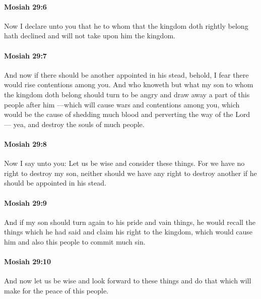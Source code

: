 		\paragraph{Mosiah 29:6} %
			\label{MOSIAH-29-6}

			Now I declare unto you that he to whom that the kingdom doth rightly belong
			hath declined and will not take upon him the kingdom.

		\paragraph{Mosiah 29:7} %
			\label{MOSIAH-29-7}

			And now if there should be another appointed in his stead,
			behold, I fear there would rise contentions among you.
			And who knoweth but what my son to whom the kingdom doth belong
			should turn to be angry and draw away a part of this people after him
			---which will cause wars and contentions among you,
			which would be the cause of shedding much blood
			and perverting the way of the Lord ---
			yea, and destroy the souls of much people.

		\paragraph{Mosiah 29:8} %
			\label{MOSIAH-29-8}

			Now I say unto you:
			Let us be wise and consider these things.
			For we have no right to destroy my son,
			neither should we have any right to destroy another
			if he should be appointed in his stead.

		\paragraph{Mosiah 29:9} %
			\label{MOSIAH-29-9}

			And if my son should turn again to his pride and vain things,
			he would recall the things which he had said
			and claim his right to the kingdom,
			which would cause him and also this people to commit much sin.

		\paragraph{Mosiah 29:10} %
			\label{MOSIAH-29-10}

			And now let us be wise and look forward to these things
			and do that which will make for the peace of this people.

